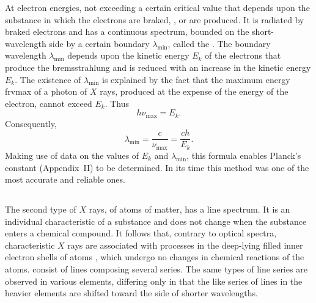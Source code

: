 At electron energies, not exceeding a certain critical value that depends upon the substance in which the electrons are braked, , or  are produced. It is radiated by braked electrons and has a continuous spectrum, bounded on the short-wavelength side by a certain boundary $\lambda_{\mathrm{min}}$, called the . The boundary wavelength $\lambda_{\mathrm{min}}$ depends upon the kinetic energy $E_{k}$ of the electrons that produce the bremsstrahlung and is reduced with an increase in the kinetic energy $E_{k}$. The existence of $\lambda_{\mathrm{min}}$ is explained by the fact that the maximum energy frvmax of a photon of $X$ rays, produced at the expense of the energy of the electron, cannot exceed $E_{k}$. Thus
\begin{equation*}%
h \nu_{\mathrm{max}} = E_{k}.
\end{equation*}
Consequently, 
\begin{equation*}%
\lambda_{\mathrm{min}} = \frac{c}{\nu_{\mathrm{max}}} = \frac{c h}{E_{k}}.
\end{equation*}
 Making use of data on the values of $E_{k}$ and $\lambda_{\mathrm{min}}$, this formula enables Planck's constant (Appendix~II) to be determined. In its time this method was one of the most accurate and reliable ones.

\subsection{}\label{39.7.8} The second type of $X$ rays,  of atoms of matter, has a line spectrum. It is an individual characteristic of a substance and does not change when the substance enters a chemical compound. It follows that, contrary to optical spectra,
characteristic $X$ rays are associated with processes in the deep-lying filled inner electron shells of atoms , which undergo no changes in chemical reactions of the atoms.  consist of lines composing several series. The same types of line series are observed in various elements, differing only in that the like series of lines in the heavier elements are shifted toward the
side of shorter wavelengths.

